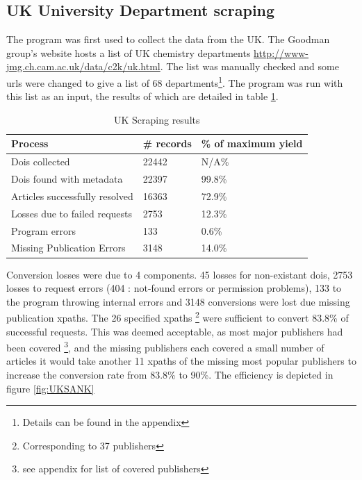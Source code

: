\subsection{UK University Department scraping}
\label{sec:UKSCRAPE}
The program was first used to collect the data from the UK. The Goodman group's website hosts a list of UK chemistry departments \url{http://www-jmg.ch.cam.ac.uk/data/c2k/uk.html}. The list was manually checked and some urls were changed to give a list of 68 departments\footnote{Details can be found in the appendix}. The program was run with this list as an input, the results of which are detailed in table \ref{tab:UKSCRAPERES}.
\begin{table}[h!]
\caption{UK Scraping results}
\label{tab:UKSCRAPERES}

\begin{center}
\begin{tabular}{||l|l|l||}
\hline
Process & \# records & \% of maximum yield\\
\hline
Dois collected & 22442 & N/A\%\\
Dois found with metadata & 22397 & 99.8\%\\
Articles successfully resolved & 16363 & 72.9\%\\
Losses due to failed requests & 2753 & 12.3\%\\
Program errors & 133 & 0.6\%\\
Missing Publication Errors & 3148 & 14.0\% \\
\hline
\end{tabular}
\end{center}
\end{table}
Conversion losses were due to 4 components. 45 losses for non-existant dois, 2753 losses to request errors (404 : not-found errors or permission problems), 133 to the program throwing internal errors and 3148 conversions were lost due missing publication xpaths. The 26 specified xpaths \footnote{Corresponding to 37 publishers} were sufficient to convert 83.8\% of successful requests. This was deemed acceptable, as most major publishers had been covered \footnote{see appendix for list of covered publishers}, and the missing publishers each covered a small number of articles it would take another 11 xpaths of the missing most popular publishers to increase the conversion rate from 83.8\% to 90\%.
The efficiency is depicted in figure \ref{fig:UKSANK}

